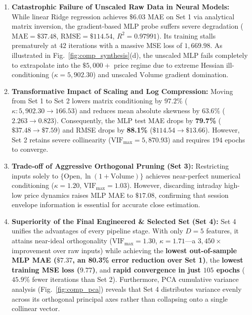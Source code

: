\documentclass[conference]{IEEEtran}
\begin{document}
\begin{enumerate}
    \item \textbf{Catastrophic Failure of Unscaled Raw Data in Neural Models:} While linear Ridge regression achieves $\$6.03$ MAE on Set 1 via analytical matrix inversion, the gradient-based MLP probe suffers severe degradation ($\text{MAE} = \$37.48$, $\text{RMSE} = \$114.54$, $R^2 = 0.97991$). Its training stalls prematurely at $42$ iterations with a massive MSE loss of $1{,}669.98$. As illustrated in Fig.~\ref{fig:comp_synthesis}(d), the unscaled MLP fails completely to extrapolate into the $\$5{,}000+$ price regime due to extreme Hessian ill-conditioning ($\kappa = 5{,}902.30$) and unscaled $\text{Volume}$ gradient domination.
    \item \textbf{Transformative Impact of Scaling and Log Compression:} Moving from Set 1 to Set 2 lowers matrix conditioning by $97.2\%$ ($\kappa: 5{,}902.30 \to 166.53$) and reduces mean absolute skewness by $63.6\%$ ($2.263 \to 0.823$). Consequently, the MLP test MAE drops by \textbf{79.7\%} ($\$37.48 \to \$7.59$) and RMSE drops by \textbf{88.1\%} ($\$114.54 \to \$13.66$). However, Set 2 retains severe collinearity ($\text{VIF}_{\max} = 5{,}870.93$) and requires $194$ epochs to converge.
    \item \textbf{Trade-off of Aggressive Orthogonal Pruning (Set 3):} Restricting inputs solely to $\{\text{Open}, \ln(1 + \text{Volume})\}$ achieves near-perfect numerical conditioning ($\kappa = 1.20$, $\text{VIF}_{\max} = 1.03$). However, discarding intraday high-low price dynamics raises MLP MAE to $\$17.08$, confirming that session envelope information is essential for accurate close estimation.
    \item \textbf{Superiority of the Final Engineered \& Selected Set (Set 4):} Set 4 unifies the advantages of every pipeline stage. With only $D = 5$ features, it attains near-ideal orthogonality ($\text{VIF}_{\max} = 1.30$, $\kappa = 1.71$---a $3{,}450\times$ improvement over raw inputs) while achieving the \textbf{lowest out-of-sample MLP MAE ($\$7.37$, an 80.3\% error reduction over Set 1)}, the \textbf{lowest training MSE loss ($9.77$)}, and \textbf{rapid convergence in just $105$ epochs} ($45.9\%$ fewer iterations than Set 2). Furthermore, PCA cumulative variance analysis (Fig.~\ref{fig:comp_pca}) reveals that Set 4 distributes variance evenly across its orthogonal principal axes rather than collapsing onto a single collinear vector.
\end{enumerate}
\end{document}
